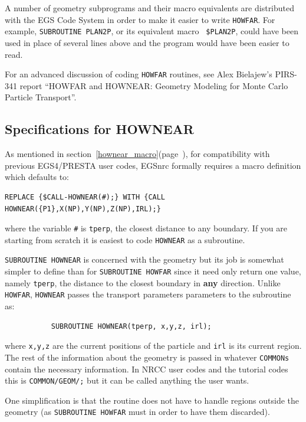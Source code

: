 A number of geometry subprograms and their macro equivalents are
distributed with the EGS Code System in order to make it easier to write
{\tt HOWFAR}.  For example, {\tt SUBROUTINE PLAN2P}, or its equivalent macro {\tt
\$PLAN2P}, could have been used in place of several lines above and the
program would have been easier to read.

For an advanced discussion of coding {\tt HOWFAR} routines, see Alex Bielajew's
PIRS-341 report ``HOWFAR and HOWNEAR: Geometry Modeling for Monte Carlo
Particle Transport''\cite{Bi95a}.


\subsection{Specifications for HOWNEAR}
\label{hownear}


As mentioned in section~\ref{hownear_macro}(page~\pageref{hownear_macro}),
for compatibility with previous  EGS4/PRESTA user codes,
EGSnrc formally requires a macro definition which defaults to:
\begin{verbatim}
REPLACE {$CALL-HOWNEAR(#);} WITH {CALL HOWNEAR({P1},X(NP),Y(NP),Z(NP),IRL);}
\end{verbatim}
where the variable {\tt \#} is {\tt tperp}, the closest distance to
any boundary.  If you are starting from scratch it is easiest to code
{\tt HOWNEAR} as a subroutine.


{\tt SUBROUTINE HOWNEAR} is concerned with the geometry but its job is
somewhat simpler to define than for {\tt SUBROUTINE HOWFAR} since it need
only return one value, namely {\tt tperp}, the distance to the closest
boundary in {\bfseries any} direction.  Unlike {\tt HOWFAR}, {\tt HOWNEAR} passes the
transport parameters parameters to the subroutine as:
\begin{verbatim}
           SUBROUTINE HOWNEAR(tperp, x,y,z, irl);
\end{verbatim}
where \verb+x,y,z+ are the current positions of the particle and \verb+irl+
is its current region.  The rest of the information about the geometry is
passed in whatever {\tt COMMONs} contain the necessary information. In NRCC
user codes and the tutorial codes this is {\tt COMMON/GEOM/;} but it can be
called anything the user wants.

One simplification is that the routine does not have to handle regions
outside the geometry (as {\tt SUBROUTINE HOWFAR} must in order to have them
discarded).

